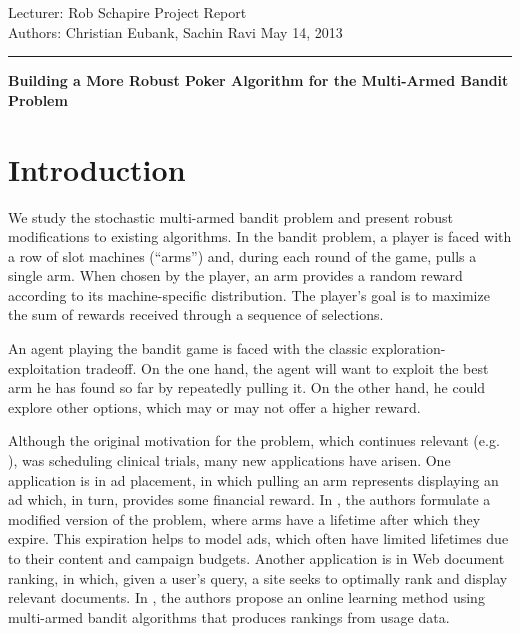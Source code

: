 \documentclass[12pt]{article}
\begin{document}
\thispagestyle{empty}


\noindent
Lecturer: Rob Schapire   %
\hfill
Project Report              %
\\
Authors: Christian Eubank, Sachin Ravi                %
\hfill
May 14, 2013           %

\noindent
\rule{\textwidth}{1pt}

\begin{center}
\bf\large Building a More Robust Poker Algorithm for the Multi-Armed Bandit Problem
\end{center}

\medskip

\section{Introduction}

We study the stochastic multi-armed bandit problem and present robust modifications to existing algorithms. In the bandit problem, a player is  
faced with a row of slot machines (``arms'') and, during each round of the game, pulls a single arm.  When chosen by the player, an arm provides a random reward according to its machine-specific distribution. The player's goal is to maximize the sum of rewards received through a
sequence of selections.  

An agent playing the bandit game is faced with the classic exploration-exploitation tradeoff.  On the one hand, the agent will want to 
exploit the best arm he has found so far by repeatedly pulling it. On the other hand, he could explore other options,
which may or may not offer a higher reward.

Although the original motivation for the problem, which continues relevant (e.g. \cite{Cassell}), was scheduling clinical trials, many 
new applications have arisen.  One application is in ad placement, in which pulling an arm represents displaying an ad which, in turn,
provides some financial reward.  In \cite{Chakrabarti}, the authors formulate a modified version
of the problem, where arms have a lifetime after which they expire. This expiration helps to model ads, which often 
have limited lifetimes due to their content and campaign budgets.  Another application is in Web document ranking, 
in which, given a user's query, a site seeks to optimally rank and display relevant documents.
In \cite{Radlinski}, the authors propose an online learning method using multi-armed bandit algorithms that produces rankings from usage data.   
\end{document}
